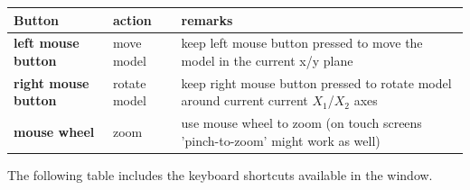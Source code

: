 \documentclass[11pt,a4paper]{book} %
\begin{document}
\begin{center}
  \footnotesize
  \begin{longtable}{| p{4cm} | p{4cm} | p{8cm} |} 
	\hline
  \bf Button & action & \bf remarks \\ \hline
  \bf left mouse button & move model & keep left mouse button pressed to move the model in the current x/y plane\\ \hline
  \bf right mouse button & rotate model & keep right mouse button pressed to rotate model around current current $X_1$/$X_2$ axes\\ \hline
  \bf mouse wheel & zoom & use mouse wheel to zoom (on touch screens 'pinch-to-zoom' might work as well) \\ \hline
  \end{longtable}
\end{center}


The following table includes the keyboard shortcuts available in the window. 
\end{document}

